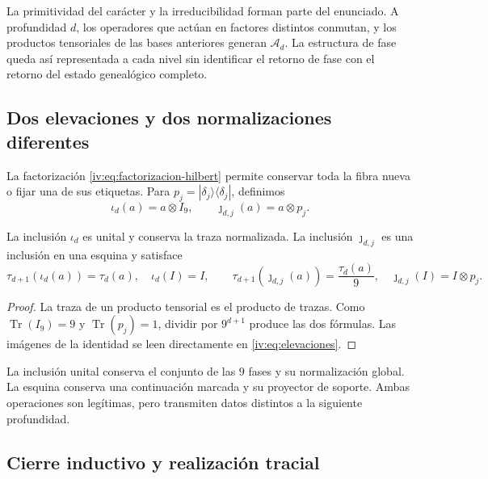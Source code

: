 La primitividad del carácter y la irreducibilidad forman parte del
enunciado. A profundidad \(d\), los operadores que actúan en factores
distintos conmutan, y los productos tensoriales de las bases anteriores
generan \(\mathcal A_d\). La estructura de fase queda así
representada a cada nivel sin identificar el retorno de fase con el
retorno del estado genealógico completo.

\subsection{Dos elevaciones y dos normalizaciones diferentes}

La factorización \eqref{iv:eq:factorizacion-hilbert} permite conservar
toda la fibra nueva o fijar una de sus etiquetas. Para
\(p_j=|\delta_j\rangle\langle\delta_j|\), definimos
\begin{equation}
 \iota_d(a)=a\otimes I_9,
 \qquad \jmath_{d,j}(a)=a\otimes p_j.
 \label{iv:eq:elevaciones}
\end{equation}
\begin{proposition}
\label{iv:prop:unidad-traza}
La inclusión \(\iota_d\) es unital y conserva la traza normalizada.
La inclusión \(\jmath_{d,j}\) es una inclusión en una esquina y
satisface
\[
 \tau_{d+1}(\iota_d(a))=\tau_d(a),\quad \iota_d(I)=I,
 \qquad
 \tau_{d+1}(\jmath_{d,j}(a))=\frac{\tau_d(a)}9,
 \quad \jmath_{d,j}(I)=I\otimes p_j.
\]
\end{proposition}
\begin{proof}
La traza de un producto tensorial es el producto de trazas.
Como \(\operatorname{Tr}(I_9)=9\) y
\(\operatorname{Tr}(p_j)=1\), dividir por \(9^{d+1}\)
produce las dos fórmulas. Las imágenes de la identidad se leen
directamente en \eqref{iv:eq:elevaciones}.
\end{proof}

La inclusión unital conserva el conjunto de las \(9\) fases y su
normalización global. La esquina conserva una continuación marcada y
su proyector de soporte. Ambas operaciones son legítimas, pero
transmiten datos distintos a la siguiente profundidad.

\subsection{Cierre inductivo y realización tracial}

